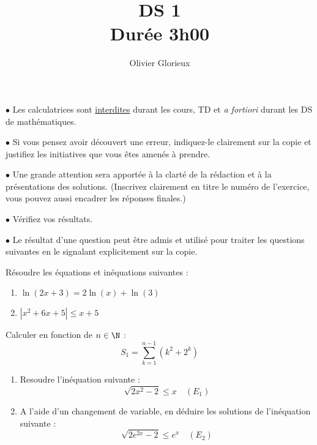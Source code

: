 \documentclass[a4paper, 11pt,reqno]{article}
\author{Olivier Glorieux}
\begin{document}
\title{DS 1\\
\Large{Durée 3h00}
}

\vspace{1cm}
\begin{center}

\begin{description}
\item$\bullet$ Les calculatrices sont \underline{interdites} durant les cours, TD et \emph{a fortiori} durant les DS de mathématiques. \\

\item $\bullet $ Si vous pensez avoir découvert une erreur, indiquez-le clairement sur la copie et justifiez les initiatives que vous êtes amenés à prendre. \\

\item $\bullet$ Une grande attention sera apportée à la clarté de la rédaction et à la présentations des solutions. (Inscrivez clairement en titre le numéro de l'exercice, vous pouvez aussi encadrer les réponses finales.)  \\

\item $\bullet$ Vérifiez vos résultats. \\

\item $\bullet$ Le résultat d'une question peut être admis et utilisé pour traiter les questions suivantes en le signalant explicitement sur la copie. 
\end{description}

\end{center} 

\newpage



\vspace{1.5cm}
\begin{exercice}
Résoudre les équations et inéquations suivantes :
\begin{enumerate}
\item $\ln (2 x+3)=2 \ln (x)+\ln (3)$
\item  $\left|x^2+6 x+5\right| \leq x+5$
\end{enumerate}
\end{exercice}
\begin{exercice}
Calculer en fonction de $n\in \N$ : 
$$S_1 =\sum_{k=1}^{n-1} (k^2+2^k)$$
\end{exercice}

\begin{exercice}
\begin{enumerate}
\item Resoudre l'inéquation suivante : 
$$\sqrt{2x^2-2} \leq x \quad (E_1)$$

\item A l'aide d'un changement de variable, en déduire les solutions de  l'inéquation suivante :
$$\sqrt{2e^{2x}-2} \leq e^x \quad (E_2)$$

\end{enumerate}


\end{exercice}
\end{document}
